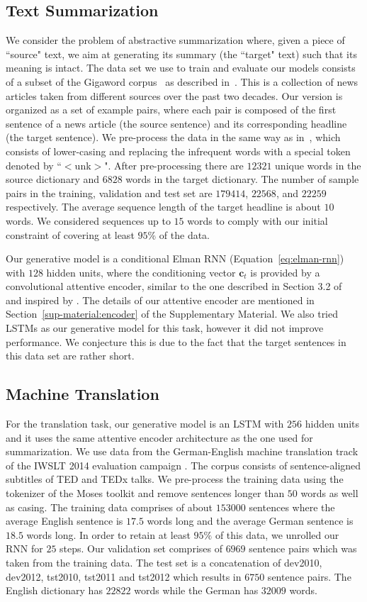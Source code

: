 \documentclass{article} \usepackage{iclr2016_conference,times}
\newcommand{\bc}{\mathbf{c}}
\begin{document}
\subsection{Text Summarization}
We consider the problem of abstractive summarization where, 
given a piece of ``source" text, we aim at generating its summary (the ``target" text)
such that its meaning is intact.  
The data set we use to train and evaluate our models consists of a 
subset of the Gigaword corpus~\citep{gigaword} as described in~\citet{rush-2015}. 
This is a collection of news articles taken from different sources over the past two decades. 
Our version is organized as a set of example pairs, where each pair is composed of the 
first sentence of a news article (the source sentence) and its corresponding headline (the target sentence). 
We pre-process the data in the same way as in~\citep{rush-2015}, which consists of lower-casing 
and replacing the infrequent words with a special token denoted by ``$<$unk$>$". After 
pre-processing there are $12321$ unique words in the source dictionary and $6828$ words in the target dictionary. The number of sample pairs in the training, validation and test set are $179414$, $22568$, 
and $22259$ respectively. The average sequence length of the target headline is about $10$ words. 
We considered sequences up to $15$ words to comply with our initial constraint of covering at least
$95$\% of the data.

Our generative model is a conditional Elman RNN (Equation~\ref{eq:elman-rnn}) with $128$ hidden units, 
where the conditioning vector $\bc_t$  is provided by a convolutional attentive encoder, 
similar to the one described in Section 3.2 of ~\citet{rush-2015} and inspired by 
\cite{bahdanau-iclr2015}. The details of our attentive 
encoder are mentioned in Section~\ref{sup-material:encoder} of the Supplementary Material.
We also tried LSTMs as our generative model for this task, however it did not improve performance. We conjecture this is due to the fact that the target sentences in this data set are rather short.

\subsection{Machine Translation}
For the translation task, our generative model is an LSTM with $256$ hidden units and it uses the same attentive encoder architecture as the one used for summarization. 
We use data from the German-English machine translation track of the
IWSLT 2014 evaluation campaign \citep{cettolo2014}.
The corpus consists of sentence-aligned subtitles of TED and TEDx 
talks. We pre-process the training data using the tokenizer of the Moses 
toolkit \citep{koehn2007} and remove sentences longer than $50$ words as well as casing.  
The training data comprises of about $153000$ sentences where the average English 
sentence is $17.5$ words long and the average German sentence is 
$18.5$ words long. In order to retain at least $95\%$ of this data, we unrolled our RNN for $25$ steps.
Our validation set comprises of $6969$ sentence pairs which was taken from the training data. The test set is a concatenation of dev2010, dev2012, tst2010, tst2011 and tst2012 
which results in $6750$ sentence pairs. The English dictionary has $22822$ words while the German has $32009$ words. 
\end{document}
